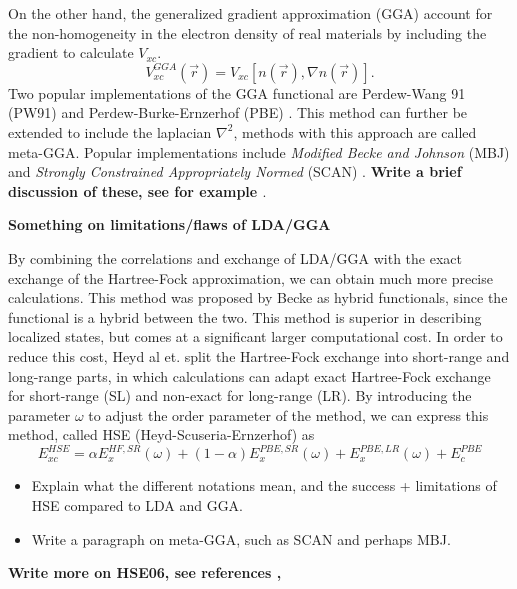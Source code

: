 On the other hand, the generalized gradient approximation (GGA) account for the non-homogeneity in the electron density of real materials by including the gradient to calculate $V_{xc}$. 
\begin{equation}
    V_{xc}^{GGA}(\vec{r}) = V_{xc}[n(\vec{r}), \nabla n(\vec{r})].
\end{equation}
Two popular implementations of the GGA functional are Perdew-Wang 91 (PW91) \cite{pw91} and Perdew-Burke-Ernzerhof (PBE) \cite{pbe}. This method can further be extended to include the laplacian $\nabla^2$, methods with this approach are called meta-GGA. Popular implementations include \textit{Modified Becke and Johnson} (MBJ) \cite{mbj} and \textit{Strongly Constrained Appropriately Normed} (SCAN) \cite{scan}. \textbf{Write a brief discussion of these, see for example \cite{scan2}}.

\textbf{Something on limitations/flaws of LDA/GGA}

By combining the correlations and exchange of LDA/GGA with the exact exchange of the Hartree-Fock approximation, we can obtain much more precise calculations. This method was proposed by Becke as hybrid functionals, since the functional is a hybrid between the two. This method is superior in describing localized states, but comes at a significant larger computational cost. In order to reduce this cost, Heyd al et. split the Hartree-Fock exchange into short-range and long-range parts, in which calculations can adapt exact Hartree-Fock exchange for short-range (SL) and non-exact for long-range (LR). By introducing the parameter $\omega$ to adjust the order parameter of the method, we can express this method, called HSE (Heyd-Scuseria-Ernzerhof) \cite{hse06} as
\begin{equation}
    E_{xc}^{HSE} = \alpha E_{x}^{HF,SR}(\omega) + (1-\alpha)E_{x}^{PBE, SR}(\omega) + E_x^{PBE,LR}(\omega) + E_{c}^{PBE}
\end{equation}
\begin{itemize}
    \item Explain what the different notations mean, and the success + limitations of HSE compared to LDA and GGA.
    \item Write a paragraph on meta-GGA, such as SCAN and perhaps MBJ.
\end{itemize}
\textbf{Write more on HSE06, see references \cite{hf_bandgap}, \cite{hf_comparision}}

